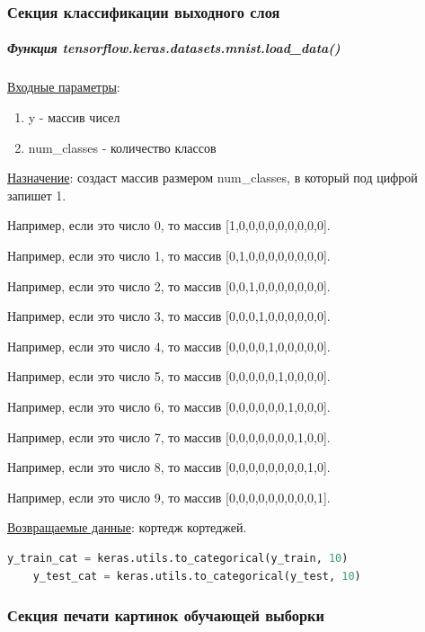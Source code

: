 \subsubsection{Секция классификации выходного слоя}

\subparagraph{Функция tensorflow.keras.datasets.mnist.load\_data()} \hspace{0pt}

\underline{Входные параметры}:

\begin{enumerate}
    \item y - массив чисел
    \item num\_classes - количество классов
\end{enumerate}

\underline{Назначение}: создаст массив размером num\_classes, в который под цифрой запишет 1.

Например, если это число 0, то массив [1,0,0,0,0,0,0,0,0,0].

Например, если это число 1, то массив [0,1,0,0,0,0,0,0,0,0].

Например, если это число 2, то массив [0,0,1,0,0,0,0,0,0,0].

Например, если это число 3, то массив [0,0,0,1,0,0,0,0,0,0].

Например, если это число 4, то массив [0,0,0,0,1,0,0,0,0,0].

Например, если это число 5, то массив [0,0,0,0,0,1,0,0,0,0].

Например, если это число 6, то массив [0,0,0,0,0,0,1,0,0,0].

Например, если это число 7, то массив [0,0,0,0,0,0,0,1,0,0].

Например, если это число 8, то массив [0,0,0,0,0,0,0,0,1,0].

Например, если это число 9, то массив [0,0,0,0,0,0,0,0,0,1].

\underline{Возвращаемые данные}: кортедж кортеджей.

\begin{lstlisting}[language=Python,]
    y_train_cat = keras.utils.to_categorical(y_train, 10)
    y_test_cat = keras.utils.to_categorical(y_test, 10)
\end{lstlisting}



\subsubsection{Секция печати картинок обучающей выборки}

